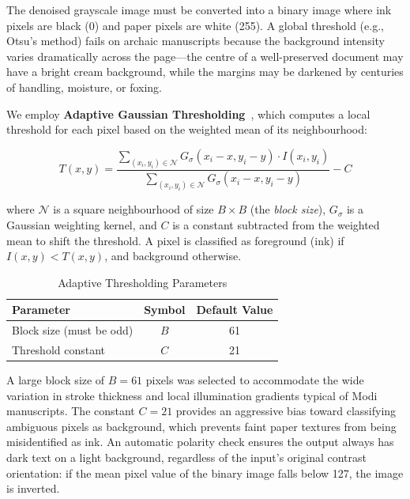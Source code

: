 \documentclass[12pt, a4paper]{article}
\begin{document}
The denoised grayscale image must be converted into a binary image where ink pixels are black (0) and paper pixels are white (255). A global threshold (e.g., Otsu's method) fails on archaic manuscripts because the background intensity varies dramatically across the page---the centre of a well-preserved document may have a bright cream background, while the margins may be darkened by centuries of handling, moisture, or foxing.

We employ \textbf{Adaptive Gaussian Thresholding}~\cite{kausadikar2025}, which computes a local threshold for each pixel based on the weighted mean of its neighbourhood:

\begin{equation}
    T(x,y) = \frac{\sum_{(x_i,y_i) \in \mathcal{N}} G_{\sigma}(x_i - x, y_i - y) \cdot I(x_i, y_i)}{\sum_{(x_i,y_i) \in \mathcal{N}} G_{\sigma}(x_i - x, y_i - y)} - C
    \label{eq:adaptive_thresh}
\end{equation}

where $\mathcal{N}$ is a square neighbourhood of size $B \times B$ (the \emph{block size}), $G_\sigma$ is a Gaussian weighting kernel, and $C$ is a constant subtracted from the weighted mean to shift the threshold. A pixel is classified as foreground (ink) if $I(x,y) < T(x,y)$, and background otherwise.

\begin{table}[H]
\centering
\caption{Adaptive Thresholding Parameters}
\label{tab:thresh_params}
\begin{tabular}{@{}lcc@{}}
\toprule
\textbf{Parameter} & \textbf{Symbol} & \textbf{Default Value} \\
\midrule
Block size (must be odd) & $B$ & 61 \\
Threshold constant & $C$ & 21 \\
\bottomrule
\end{tabular}
\end{table}

A large block size of $B = 61$ pixels was selected to accommodate the wide variation in stroke thickness and local illumination gradients typical of Modi manuscripts. The constant $C = 21$ provides an aggressive bias toward classifying ambiguous pixels as background, which prevents faint paper textures from being misidentified as ink. An automatic polarity check ensures the output always has dark text on a light background, regardless of the input's original contrast orientation: if the mean pixel value of the binary image falls below 127, the image is inverted.
\end{document}
